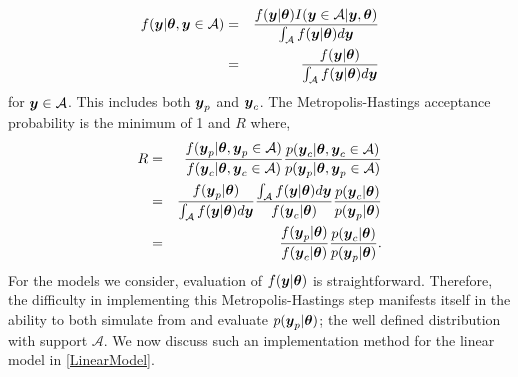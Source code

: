\documentclass[12pt]{article}
\def\bth{\mbox{\boldmath $\theta$}}
\newcommand{\by}{\mbox{\boldmath $y$}}
\newcommand{\red}[1]{{\color{red}#1}}
\newcommand{\green}[1]{{\color{green}#1}}
\begin{document}
\begin{eqnarray*}
f(\by | \bth, \by \in \mathcal{A}) & = & \frac{f(\by | \bth) I(\by \in \mathcal{A} | \by, \bth)}{\int_\mathcal{A} f(\by | \bth) d\by} \\
     & = & \frac{f(\by | \bth)}{\int_\mathcal{A} f(\by | \bth) d\by} 
\end{eqnarray*}
for $\by \in \mathcal{A}$.  This includes both $\by_p$ and $\by_c$.  The Metropolis-Hastings acceptance probability  is the minimum of 1 and $R$ where,
\begin{eqnarray}
\label{MHRatio}
R & = & \frac{f(\by_p|\bth,\by_p \in \mathcal{A})}{f(\by_c|\bth,\by_c \in \mathcal{A})}  
                \frac{p(\by_c|\bth, \by_c \in \mathcal{A})}{p(\by_p|\bth,\by_p \in \mathcal{A})} \\
  & = & \frac{f(\by_p | \bth)}{\int_\mathcal{A} f(\by | \bth) d\by} \frac{\int_\mathcal{A} f(\by | \bth) d\by}{f(\by_c | \bth)} \frac{p(\by_c | \bth)}{p(\by_p | \bth)} \\
 & = & \frac{f(\by_p|\bth)}{f(\by_c|\bth)} \frac{p(\by_c|\bth)}{p(\by_p|\bth)} .  
\end{eqnarray}
For the models we consider, evaluation of $f(\by | \bth)$ is straightforward.  Therefore, the difficulty in implementing this Metropolis-Hastings step manifests  itself in the ability to both simulate from and evaluate $p(\by_p | \bth)$; the well defined distribution with support $\mathcal{A}$. We now discuss such an implementation method for the linear model in \eqref{LinearModel}.
\end{document}
